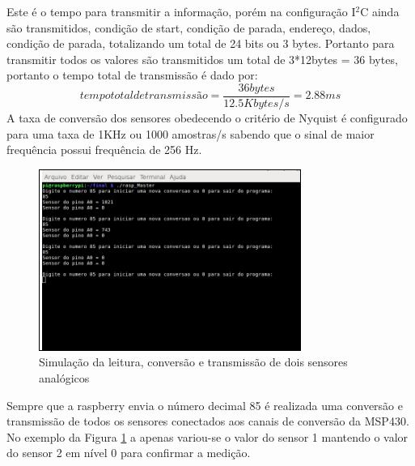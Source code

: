 Este é o tempo para transmitir a informação, porém na configuração I$^{2}$C ainda são transmitidos, condição de start, condição de parada, endereço, dados, condição de parada, totalizando um total de 24 bits ou 3 bytes. Portanto para transmitir todos os valores são transmitidos um total de 3*12bytes = 36 bytes, portanto o tempo total de transmissão é dado por:
\begin{equation}
tempo total de transmissão = \frac{36bytes}{12.5Kbytes/s} = 2.88 ms
\end{equation}
A taxa de conversão dos sensores obedecendo o critério de Nyquist é configurado para uma taxa de 1KHz ou 1000 amostras/s sabendo que o sinal de maior frequência possui frequência de 256 Hz.
\\%
\begin{figure}[h!]
	\centering
	\includegraphics[keepaspectratio=true,scale= 1.5]{figuras/Simulacao_I2C.PNG}
	\caption{Simulação da leitura, conversão e transmissão de dois sensores analógicos}
	\label{Simulação}
\end{figure}
Sempre que a raspberry envia o número decimal 85 é realizada uma conversão e transmissão de todos os sensores conectados aos canais de conversão da MSP430. No exemplo da Figura \ref{Simulação} a apenas variou-se o valor do sensor 1 mantendo o valor do sensor 2 em nível 0 para confirmar a medição.
